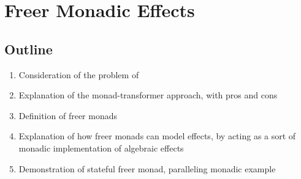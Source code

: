 \chapter{Freer Monadic Effects}

\section{Outline}
\begin{enumerate}
  \item Consideration of the problem of 
  \item Explanation of the monad-transformer approach, with pros and cons
  \item Definition of freer monads
  \item Explanation of how freer monads can model effects, by acting as a sort of monadic implementation of algebraic effects
  \item Demonstration of stateful freer monad, paralleling monadic example
\end{enumerate}

